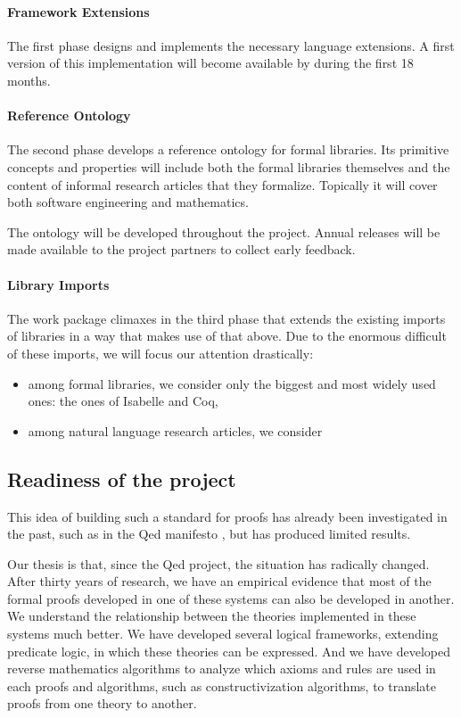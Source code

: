 \paragraph{Framework Extensions}
The first phase designs and implements the necessary language extensions.
A first version of this implementation will become available by during the first 18 months.



\paragraph{Reference Ontology}
The second phase develops a reference ontology for formal libraries.
Its primitive concepts and properties will include both the formal libraries themselves and the content of informal research articles that they formalize.
Topically it will cover both software engineering and mathematics.

The ontology will be developed throughout the project.
Annual releases will be made available to the project partners to collect early feedback.

\paragraph{Library Imports}
The work package climaxes in the third phase that extends the existing imports of libraries in a way that makes use of that above.
Due to the enormous difficult of these imports, we will focus our attention drastically:
\begin{itemize}
  \item among formal libraries, we consider only the biggest and most widely used ones: the ones of Isabelle and Coq,
  \item among natural language research articles, we consider    
\end{itemize}



\subsection{Readiness of the project}

This idea of building such a standard for proofs has already been
investigated in the past, such as in the Qed manifesto \cite{Qed94}, but
has produced limited results.

Our thesis is that, since the
Qed project, the situation has radically changed. After
thirty years of research, we have an empirical evidence that most of
the formal proofs developed in one of these systems can also be
developed in another. We understand the relationship between the
theories implemented in these systems much better. We have developed
several logical frameworks, extending predicate logic, in which these
theories can be expressed. And we have developed reverse mathematics
algorithms to analyze which axioms and rules are used in each proofs
and algorithms, such as constructivization algorithms, to translate
proofs from one theory to another.


